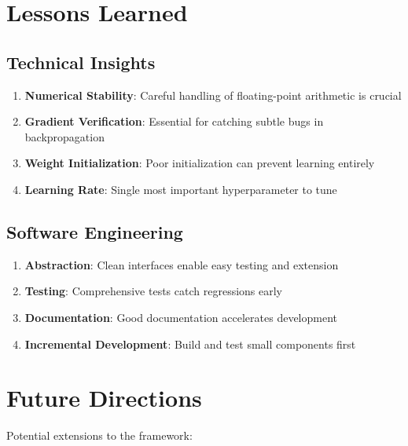 \documentclass[12pt,a4paper]{article}
\begin{document}
\section{Lessons Learned}

\subsection{Technical Insights}

\begin{enumerate}
    \item \textbf{Numerical Stability}: Careful handling of floating-point arithmetic is crucial
    \item \textbf{Gradient Verification}: Essential for catching subtle bugs in backpropagation
    \item \textbf{Weight Initialization}: Poor initialization can prevent learning entirely
    \item \textbf{Learning Rate}: Single most important hyperparameter to tune
\end{enumerate}

\subsection{Software Engineering}

\begin{enumerate}
    \item \textbf{Abstraction}: Clean interfaces enable easy testing and extension
    \item \textbf{Testing}: Comprehensive tests catch regressions early
    \item \textbf{Documentation}: Good documentation accelerates development
    \item \textbf{Incremental Development}: Build and test small components first
\end{enumerate}

\section{Future Directions}

Potential extensions to the framework:
\end{document}
